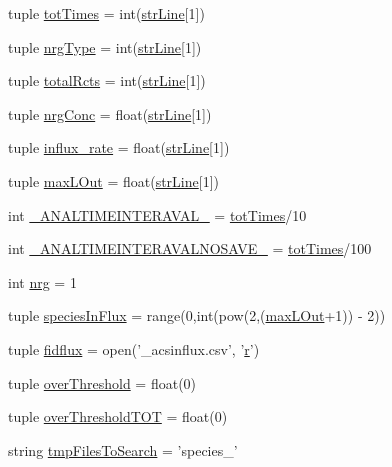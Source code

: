 \begin{DoxyCompactItemize}
tuple \hyperlink{a00096_a20df40e09bc9514382d71f15783c7856}{tot\-Times} = int(\hyperlink{a00096_a072631e11db72789389935b0f9efff8d}{str\-Line}\mbox{[}1\mbox{]})
\item 
tuple \hyperlink{a00096_a0d0c83fd90489be59b1f5a31dadf4469}{nrg\-Type} = int(\hyperlink{a00096_a072631e11db72789389935b0f9efff8d}{str\-Line}\mbox{[}1\mbox{]})
\item 
tuple \hyperlink{a00096_a9f0e87ff21f3597668f5ad076224da87}{total\-Rcts} = int(\hyperlink{a00096_a072631e11db72789389935b0f9efff8d}{str\-Line}\mbox{[}1\mbox{]})
\item 
tuple \hyperlink{a00096_a24d5f5a61d56c596017396ad272ef4a4}{nrg\-Conc} = float(\hyperlink{a00096_a072631e11db72789389935b0f9efff8d}{str\-Line}\mbox{[}1\mbox{]})
\item 
tuple \hyperlink{a00096_a3a8adee26325d72aca909e91b0fd3ea5}{influx\-\_\-rate} = float(\hyperlink{a00096_a072631e11db72789389935b0f9efff8d}{str\-Line}\mbox{[}1\mbox{]})
\item 
tuple \hyperlink{a00096_a47da7b9153a0e4a33512f6d2675b8c1a}{max\-L\-Out} = float(\hyperlink{a00096_a072631e11db72789389935b0f9efff8d}{str\-Line}\mbox{[}1\mbox{]})
\item 
int \hyperlink{a00096_a46f1fb71bdcdb1c8679ae847d0d4b63f}{\-\_\-\-A\-N\-A\-L\-T\-I\-M\-E\-I\-N\-T\-E\-R\-A\-V\-A\-L\-\_\-} = \hyperlink{a00096_a20df40e09bc9514382d71f15783c7856}{tot\-Times}/10
\item 
int \hyperlink{a00096_a7665e828ed7f27f4ba353e9645ad716d}{\-\_\-\-A\-N\-A\-L\-T\-I\-M\-E\-I\-N\-T\-E\-R\-A\-V\-A\-L\-N\-O\-S\-A\-V\-E\-\_\-} = \hyperlink{a00096_a20df40e09bc9514382d71f15783c7856}{tot\-Times}/100
\item 
int \hyperlink{a00096_a948683f966c62ac856582281c3cda1f4}{nrg} = 1
\item 
tuple \hyperlink{a00096_a36f6b63269e716f42cd38a36a781a4cf}{species\-In\-Flux} = range(0,int(pow(2,(\hyperlink{a00096_a47da7b9153a0e4a33512f6d2675b8c1a}{max\-L\-Out}+1)) -\/ 2))
\item 
tuple \hyperlink{a00096_a0c40e4d9928e8df792b31c7a431d3fba}{fidflux} = open('\-\_\-acsinflux.\-csv', '\hyperlink{a00025_ac862e7284527eb913b1351c8bfb8e079}{r}')
\item 
tuple \hyperlink{a00096_a12e61f8d7aadb52256a7728af342bae3}{over\-Threshold} = float(0)
\item 
tuple \hyperlink{a00096_a93de20dd9ebf791127ac5aefc0a2df8d}{over\-Threshold\-T\-O\-T} = float(0)
\item 
string \hyperlink{a00096_a141356fc914110fdf3ec4f0fc3beaab5}{tmp\-Files\-To\-Search} = 'species\-\_\-'

\end{DoxyCompactItemize}
